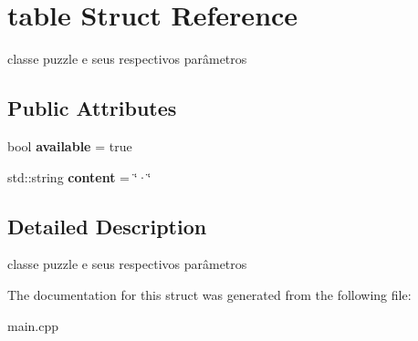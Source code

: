 \hypertarget{structtable}{}\section{table Struct Reference}
\label{structtable}


classe puzzle e seus respectivos parâmetros  


\subsection*{Public Attributes}
\begin{DoxyCompactItemize}
\item 
\mbox{\label{structtable_af9f89c0e10d26e98f9fbf07aeea499af}} 
bool {\bfseries available} = true
\item 
\mbox{\label{structtable_a1327175b5006d8aa20b4ac308d31f6a2}} 
std\+::string {\bfseries content} = \char`\"{}·\char`\"{}
\end{DoxyCompactItemize}


\subsection{Detailed Description}
classe puzzle e seus respectivos parâmetros 

The documentation for this struct was generated from the following file\+:\begin{DoxyCompactItemize}
\item 
main.\+cpp\end{DoxyCompactItemize}
